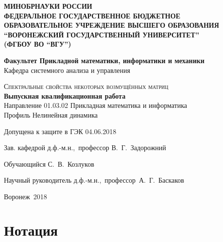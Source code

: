 \documentclass[14pt,a4paper]{extarticle}
\theoremstyle{definition}
\begin{document}

\newpage

\makeatletter
{
  \null
  \thispagestyle{empty}
  \newpage
}

\setcounter{page}{0}
\begin{center}
  \textbf{МИНОБРНАУКИ РОССИИ\\
  ФЕДЕРАЛЬНОЕ ГОСУДАРСТВЕННОЕ БЮДЖЕТНОЕ ОБРАЗОВАТЕЛЬНОЕ УЧРЕЖДЕНИЕ ВЫСШЕГО
  ОБРАЗОВАНИЯ ``ВОРОНЕЖСКИЙ ГОСУДАРСТВЕННЫЙ УНИВЕРСИТЕТ''\\
(ФГБОУ ВО ``ВГУ'')}
\end{center}

\vfill

\begin{center}
  \textbf{Факультет Прикладной математики, информатики и механики}\\
  Кафедра системного анализа и управления
\end{center}

\vfill

\begin{center}
  \textsc{\Large Спектральные свойства некоторых возмущённых матриц}\\[.5cm]
  \textbf{Выпускная квалификационная работа}\\
  Направление 01.03.02 Прикладная математика и информатика\\
  Профиль Нелинейная динамика
\end{center}

\vfill
\begin{center}
  {Допущена к защите в ГЭК 04.06.2018}
  \end{center}

\vfill
\begin{center}
  {Зав. кафедрой \hfill д.ф.-м.н.,~профессор В.~Г.~Задорожний}
  \vspace{1cm}

  {Обучающийся \hfill С.~В.~Козлуков}

  \vspace{1cm}
  {Научный руководитель \hfill д.ф.-м.н.,~профессор~А.~Г.~Баскаков}
\end{center}
 
\vfill
\begin{center}
  Воронеж~2018
\end{center}

{
\pagestyle{empty}
\newpage
}
\setcounter{tocdepth}{2}
\tableofcontents
\newpage

\section*{Нотация}
\end{document}
